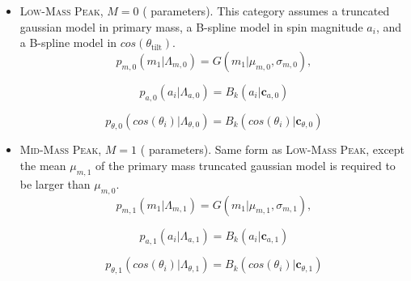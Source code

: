 \begin{itemize}
    \item \textsc{Low-Mass Peak}, $M=0$ ( parameters). This category assumes a truncated gaussian model in primary mass, a B-spline model in spin magnitude $a_i$, and a B-spline model in $cos(\theta_{\text{tilt}})$. 
    \begin{equation} \label{eq:lowmass}
        p_{m,0}(m_1| \Lambda_{m,0}) = G(m_1 | \mu_{m,0}, \sigma_{m,0}),
    \end{equation}

    \begin{equation} \label{eq:lowspin}
        p_{a,0}(a_i| \Lambda_{a,0}) = B_k(a_i | \mathbf{c}_{a,0})
    \end{equation}

    \begin{equation} \label{eq:lowtilt}
        p_{\theta,0}(cos(\theta_i)| \Lambda_{\theta,0}) = B_k( cos(\theta_i) | \mathbf{c}_{\theta,0})
    \end{equation}
\end{itemize}

\begin{itemize}
    \item \textsc{Mid-Mass Peak}, $M=1$ ( parameters). Same form as \textsc{Low-Mass Peak}, except the mean $\mu_{m,1}$ of the primary mass truncated gaussian model is required to be larger than $\mu_{m,0}$.
    \begin{equation} \label{eq:midmass}
        p_{m,1}(m_1| \Lambda_{m,1}) = G(m_1 | \mu_{m,1}, \sigma_{m,1}),
    \end{equation}

    \begin{equation} \label{eq:midspin}
        p_{a,1}(a_i| \Lambda_{a,1}) = B_k(a_i | \mathbf{c}_{a,1})
    \end{equation}

    \begin{equation} \label{eq:midtilt}
        p_{\theta,1}(cos(\theta_i)| \Lambda_{\theta,1}) = B_k( cos(\theta_i) | \mathbf{c}_{\theta,1})
    \end{equation}
    
\end{itemize}

